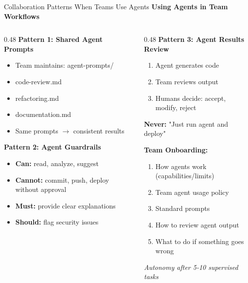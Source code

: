 \documentclass[aspectratio=169,11pt]{beamer}
\begin{document}
\begin{frame}{Collaboration Patterns When Teams Use Agents}
    \textbf{Using Agents in Team Workflows}

    \begin{columns}[T]
        \begin{column}{0.48\textwidth}
            \textbf{Pattern 1: Shared Agent Prompts}
            \begin{itemize}
                \item Team maintains: agent-prompts/
                \item code-review.md
                \item refactoring.md
                \item documentation.md
                \item Same prompts $\rightarrow$ consistent results
            \end{itemize}

            \vspace{0.3cm}
            \textbf{Pattern 2: Agent Guardrails}
            \begin{itemize}
                \item \textbf{Can:} read, analyze, suggest
                \item \textbf{Cannot:} commit, push, deploy without approval
                \item \textbf{Must:} provide clear explanations
                \item \textbf{Should:} flag security issues
            \end{itemize}
        \end{column}
        \begin{column}{0.48\textwidth}
            \textbf{Pattern 3: Agent Results Review}
            \begin{enumerate}
                \item Agent generates code
                \item Team reviews output
                \item Humans decide: accept, modify, reject
            \end{enumerate}
            \textbf{Never:} "Just run agent and deploy"

            \vspace{0.3cm}
            \textbf{Team Onboarding:}
            \begin{enumerate}
                \item How agents work (capabilities/limits)
                \item Team agent usage policy
                \item Standard prompts
                \item How to review agent output
                \item What to do if something goes wrong
            \end{enumerate}

            \textit{Autonomy after 5-10 supervised tasks}
        \end{column}
    \end{columns}
\end{frame}
\end{document}
